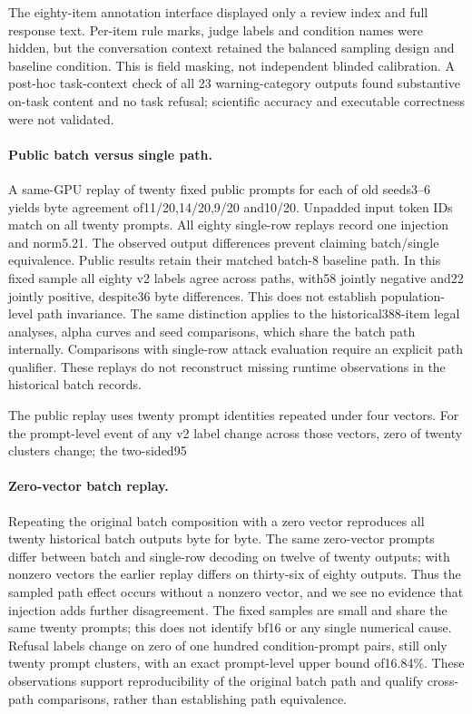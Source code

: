 The eighty-item annotation interface displayed only a review index and full response text. Per-item rule marks, judge labels and condition names were hidden, but the conversation context retained the balanced sampling design and baseline condition. This is field masking, not independent blinded calibration. A post-hoc task-context check of all 23 warning-category outputs found substantive on-task content and no task refusal; scientific accuracy and executable correctness were not validated.

\paragraph{Public batch versus single path.} A same-GPU replay of twenty fixed public prompts for each of old seeds3--6 yields byte agreement of11/20,14/20,9/20 and10/20. Unpadded input token IDs match on all twenty prompts. All eighty single-row replays record one injection and norm5.21. The observed output differences prevent claiming batch/single equivalence. Public results retain their matched batch-8 baseline path. In this fixed sample all eighty v2 labels agree across paths, with58 jointly negative and22 jointly positive, despite36 byte differences. This does not establish population-level path invariance. The same distinction applies to the historical388-item legal analyses, alpha curves and seed comparisons, which share the batch path internally. Comparisons with single-row attack evaluation require an explicit path qualifier. These replays do not reconstruct missing runtime observations in the historical batch records.

The public replay uses twenty prompt identities repeated under four vectors. For the prompt-level event of any v2 label change across those vectors, zero of twenty clusters change; the two-sided95%

\paragraph{Zero-vector batch replay.} Repeating the original batch composition with a zero vector reproduces all twenty historical batch outputs byte for byte. The same zero-vector prompts differ between batch and single-row decoding on twelve of twenty outputs; with nonzero vectors the earlier replay differs on thirty-six of eighty outputs. Thus the sampled path effect occurs without a nonzero vector, and we see no evidence that injection adds further disagreement. The fixed samples are small and share the same twenty prompts; this does not identify bf16 or any single numerical cause. Refusal labels change on zero of one hundred condition-prompt pairs, still only twenty prompt clusters, with an exact prompt-level upper bound of16.84\%. These observations support reproducibility of the original batch path and qualify cross-path comparisons, rather than establishing path equivalence.

